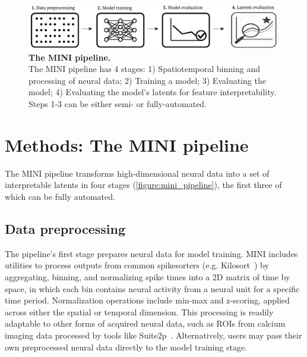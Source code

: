 \begin{figure}[h]
    \centering
    \includegraphics[width=\linewidth]{figures/mini_pipeline.pdf}
    \caption{
        \textbf{The MINI pipeline.} \\
        \small The MINI pipeline has 4 stages: 1) Spatiotemporal binning and processing of neural data; 2) Training a model; 3) Evaluating the model; 4) Evaluating the model's latents for feature interpretability. Steps 1-3 can be either semi- or fully-automated.
    }
    \label{figure:mini_pipeline}
\end{figure}

\section{Methods: The MINI pipeline}

The MINI pipeline transforms high-dimensional neural data into a set of interpretable latents in four stages (\autoref{figure:mini_pipeline}), the first three of which can be fully automated.

\subsection{Data preprocessing}

The pipeline's first stage prepares neural data for model training. MINI includes utilities to process outputs from common spikesorters (e.g. Kilosort~\cite{pachitariu_2016_kilosort}) by aggregating, binning, and normalizing spike times into a 2D matrix of time by space, in which each bin contains neural activity from a neural unit for a specific time period. Normalization operations include min-max and z-scoring, applied across either the spatial or temporal dimension. This processing is readily adaptable to other forms of acquired neural data, such as ROIs from calcium imaging data processed by tools like Suite2p~\cite{pachitariu_2017_suite2p}. Alternatively, users may pass their own preprocessed neural data directly to the model training stage.

